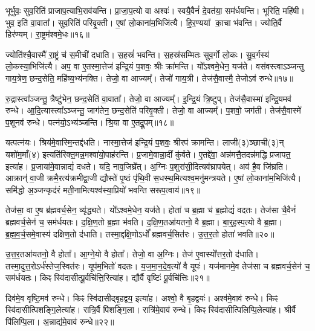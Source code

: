 भूर्भुवः॒ सुव॒रिति॑ प्राजाप॒त्याभि॒राव॑यन्ति।
प्रा॒जा॒प॒त्यो वा अश्वः॑।
स्वयै॒वैनं॑ दे॒वत॑या॒ सम॑र्धयन्ति।
भूरिति॒ महि॑षी।
भुव॒ इति॑ वा॒वाता᳚।
सुव॒रिति॑ परिवृ॒क्ती।
ए॒षां लो॒काना॑म॒भिजि॑त्यै।
हि॒र॒ण्यया᳚ का॒चा भ॑वन्ति।
ज्योति॒र्वै हिर॑ण्यम्।
रा॒ष्ट्रम॑श्वमे॒धः॥१६॥

ज्योति॑श्चै॒वास्मै॑ रा॒ष्ट्रं च॑ स॒मीची॑ दधाति।
स॒हस्रं॑ भवन्ति।
स॒हस्र॑सम्मितः सुव॒र्गो लो॒कः।
सु॒व॒र्गस्य॑ लो॒कस्या॒भिजि॑त्यै।
अप॒ वा ए॒तस्मा॒त्तेज॑ इन्द्रि॒यं प॒शवः॒ श्रीः क्रा॑मन्ति।
यो᳚ऽश्वमे॒धेन॒ यज॑ते।
वस॑वस्त्वा\-ऽञ्जन्तु गाय॒त्रेण॒ छन्द॒सेति॒ महि॑ष्य॒भ्य॑नक्ति।
तेजो॒ वा आज्यम्᳚।
तेजो॑ गाय॒त्री।
तेज॑सै॒वास्मै॒ तेजो\-ऽव॑ रुन्धे॥१७॥

रु॒द्रास्त्वा᳚ञ्जन्तु॒ त्रैष्टु॑भेन॒ छन्द॒सेति॑ वा॒वाता᳚।
तेजो॒ वा आज्यम्᳚।
इ॒न्द्रि॒यं त्रि॒ष्टुप्।
तेज॑सै॒वास्मा॑ इन्द्रि॒यमव॑ रुन्धे।
आ॒दि॒त्यास्त्वा᳚\-ऽञ्जन्तु॒ जाग॑तेन॒ छन्द॒सेति॑ परिवृ॒क्ती।
तेजो॒ वा आज्यम्᳚।
प॒शवो॒ जग॑ती।
तेज॑सै॒वास्मे॑ प॒शूनव॑ रुन्धे।
पत्न॑यो॒\-ऽभ्य॑ञ्जन्ति।
श्रि॒या वा ए॒तद्रू॒पम्॥१८॥

यत्पत्न॑यः।
श्रिय॑मे॒वास्मि॒न्तद्द॑धति।
नास्मा॒त्तेज॑ इन्द्रि॒यं प॒शवः॒ श्रीरप॑ क्रामन्ति।
लाजी(३)ञ्छाची(३)न् यशो॑म॒माँ(४) इत्यति॑रिक्त॒मन्न॒मश्वा॑यो॒पाह॑रन्ति।
प्र॒जामे॒वान्ना॒दीं कु॑र्वते।
ए॒तद्दे॑वा॒ अन्न॑मत्तै॒तदन्न॑मद्धि प्रजापत॒ इत्या॑ह।
प्र॒जाया॑मे॒वान्नाद्यं॑ दधते।
यदि॒ नाव॒जिघ्रे᳚त्।
अ॒ग्निः प॒शुरा॑सी॒दित्यव॑घ्रापयेत्।
अव॑ है॒व जि॑घ्रति।
आक्रान्॑ वा॒जी क्रमै॒रत्य॑क्रमीद्वा॒जी द्यौस्ते॑ पृ॒ष्ठं पृ॑थि॒वी स॒धस्थ॒मित्यश्व॒मनु॑मन्त्रयते।
ए॒षां लो॒काना॑म॒भिजि॑त्यै।
समि॑द्धो अ॒ञ्जन्कृद॑रं मती॒नामित्यश्व॑स्या॒प्रियो॑ भवन्ति सरूप॒त्वाय॑॥१९॥\anuvakamend[परि॑त॒स्थुष॒ इत्या॑हे॒मे ए॒वास्मै॑ युनक्त्य॒भिजि॑त्यै भरन्त्यश्वमे॒धो रु॑न्धे रू॒पञ्जि॑घ्रति॒ त्रीणि॑ च]

तेज॑सा॒ वा ए॒ष ब्र॑ह्मवर्च॒सेन॒ व्यृ॑द्ध्यते।
यो᳚ऽश्वमे॒धेन॒ यज॑ते।
होता॑ च ब्र॒ह्मा च॑ ब्र॒ह्मोद्यं॑ वदतः।
तेज॑सा चै॒वैनं॑ ब्रह्मवर्च॒सेन॑ च॒ सम॑र्धयतः।
द॒क्षि॒ण॒तो ब्र॒ह्मा भ॑वति।
द॒क्षि॒ण॒तआ॑यतनो॒ वै ब्र॒ह्मा।
बा॒र्॒ह॒स्प॒त्यो वै ब्र॒ह्मा।
ब्र॒ह्म॒व॒र्च॒समे॒वास्य॑ दक्षिण॒तो द॑धाति।
तस्मा॒द्दक्षि॒णो\-ऽर्धो᳚ ब्रह्मवर्च॒सित॑रः।
उ॒त्त॒र॒तो होता॑ भवति॥२०॥

उ॒त्त॒र॒तआ॑यतनो॒ वै होता᳚।
आ॒ग्ने॒यो वै होता᳚।
तेजो॒ वा अ॒ग्निः।
तेज॑ ए॒वास्यो᳚त्तर॒तो द॑धाति।
तस्मा॒दुत्त॒रो\-ऽर्ध॑स्तेज॒स्वित॑रः।
यूप॑म॒भितो॑ वदतः।
य॒ज॒मा॒न॒दे॒व॒त्यो॑ वै यूपः॑।
यज॑मानमे॒व तेज॑सा च ब्रह्मवर्च॒सेन॑ च॒ सम॑र्धयतः।
किꣴ स्वि॑दासीत्पू॒र्वचि॑त्ति॒रित्या॑ह।
द्यौर्वै वृष्टिः॑ पू॒र्वचि॑त्तिः॥२१॥

दिव॑मे॒व वृष्टि॒मव॑ रुन्धे।
किꣴ स्वि॑दासीद्बृ॒हद्वय॒ इत्या॑ह।
अश्वो॒ वै बृ॒हद्वयः॑।
अश्व॑मे॒वाव॑ रुन्धे।
किꣴ स्वि॑दासीत्पिशङ्गि॒लेत्या॑ह।
रात्रि॒र्वै पि॑शङ्गि॒ला।
रात्रि॑मे॒वाव॑ रुन्धे।
किꣴ स्वि॑दासीत्पिलिप्पि॒लेत्या॑ह।
श्रीर्वै पि॑लिप्पि॒ला।
अ॒न्नाद्य॑मे॒वाव॑ रुन्धे॥२२॥

